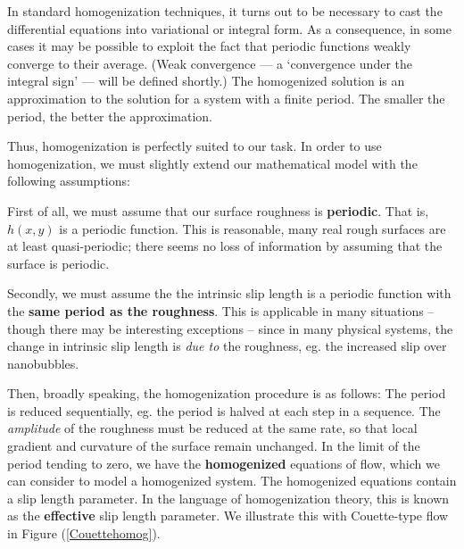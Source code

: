 \documentclass[12pt, a4paper, twoside, openright]{book}
\begin{document}
In standard homogenization techniques, it turns out to be necessary to cast the differential equations into variational or integral form.  As a consequence, in some cases it may be possible to exploit the fact that periodic functions weakly converge to their average.  (Weak convergence --- a `convergence under the integral sign' --- will be defined shortly.)
The homogenized solution is an approximation to the solution for a system with a finite period.  The smaller the period, the better the approximation.



\vspace{1em}
Thus, homogenization is perfectly suited to our task.  
In order to use homogenization, we must slightly extend our mathematical model with the following assumptions:

\vspace{1em}
First of all, we must assume that our surface roughness is \textbf{periodic}.  That is, $h(x,y)$ is a periodic function.  This is reasonable, many real rough surfaces are at least quasi-periodic; there seems no loss of information by assuming that the surface is periodic.

Secondly, we must assume the the intrinsic slip length is a periodic function with the \textbf{same period as the roughness}. %
This is applicable in many situations -- though there may be interesting exceptions -- since
in many physical systems, the change in intrinsic slip length is \emph{due to} the roughness, eg. the increased slip over nanobubbles.

\vspace{1em}
Then, broadly speaking, the homogenization procedure is as follows:
The period is reduced sequentially, eg. the period is halved at each step in a sequence.
The \emph{amplitude} of the roughness must be reduced at the same rate, so that local gradient and curvature of the surface remain unchanged.  In the limit of the period tending to zero, we have the \textbf{homogenized} equations of flow, which we can consider to model a homogenized system.  The homogenized equations contain a slip length parameter.  In the language of homogenization theory, this is known as the \textbf{effective} slip length parameter.
We  illustrate this with Couette-type flow in Figure (\ref{Couettehomog}).
\end{document}

